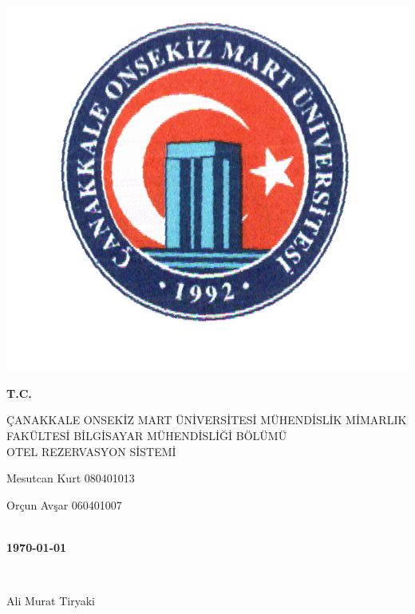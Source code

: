 \documentclass[12pt, a4paper]{article}
\begin{document}
\begin{center}

\includegraphics{comu-head.png}

\bfseries
\large
T.C.

ÇANAKKALE ONSEKİZ MART ÜNİVERSİTESİ
MÜHENDİSLİK MİMARLIK FAKÜLTESİ
BİLGİSAYAR MÜHENDİSLİĞİ BÖLÜMÜ
\\[4cm]
OTEL REZERVASYON SİSTEMİ
\\[5cm]

\normalsize
\itshape

Mesutcan Kurt    080401013

Orçun Avşar      060401007

\bf
\\[1.5cm]

\today

\\[3cm]

\bf

Ali Murat Tiryaki

\end{center}
\end{document}
